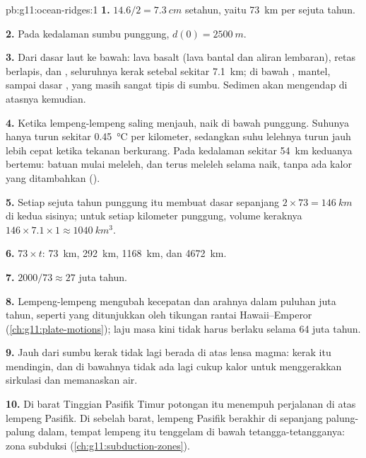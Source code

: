 \begin{solution}{pb:g11:ocean-ridges:1}
\textbf{1.} $14.6/2 = \qty{7.3}{cm}$ setahun, yaitu \qty{73}{km} per sejuta
tahun.

\textbf{2.} Pada kedalaman sumbu punggung, $d(0) = \qty{2500}{m}$.

\textbf{3.} Dari dasar laut ke bawah: lava basalt (lava bantal dan aliran
lembaran), retas berlapis, dan , seluruhnya kerak setebal sekitar
\qty{7.1}{km}; di bawah ,  mantel, sampai dasar , yang
masih sangat tipis di sumbu. Sedimen akan mengendap di atasnya kemudian.

\textbf{4.} Ketika lempeng-lempeng saling menjauh,  naik di bawah
punggung. Suhunya hanya turun sekitar \qty{0.45}{\celsius} per kilometer,
sedangkan suhu lelehnya turun jauh lebih cepat ketika tekanan berkurang. Pada
kedalaman sekitar \qty{54}{km} keduanya bertemu: batuan mulai meleleh, dan terus
meleleh selama naik, tanpa ada kalor yang ditambahkan ().

\textbf{5.} Setiap sejuta tahun punggung itu membuat dasar sepanjang
$2 \times 73 = \qty{146}{km}$ di kedua sisinya; untuk setiap kilometer punggung,
volume keraknya $146 \times 7.1 \times 1 \approx \qty{1040}{km^3}$.

\textbf{6.} $73 \times t$: \qty{73}{km}, \qty{292}{km}, \qty{1168}{km}, dan
\qty{4672}{km}.

\textbf{7.} $2000/73 \approx 27$ juta tahun.

\textbf{8.} Lempeng-lempeng mengubah kecepatan dan arahnya dalam puluhan juta
tahun, seperti yang ditunjukkan oleh tikungan rantai Hawaii--Emperor
(\cref{ch:g11:plate-motions}); laju masa kini tidak harus berlaku selama 64
juta tahun.

\textbf{9.} Jauh dari sumbu kerak tidak lagi berada di atas lensa magma: kerak
itu mendingin, dan di bawahnya tidak ada lagi cukup kalor untuk menggerakkan
sirkulasi dan memanaskan air.

\textbf{10.} Di barat Tinggian Pasifik Timur potongan itu menempuh perjalanan di
atas lempeng Pasifik. Di sebelah barat, lempeng Pasifik berakhir di sepanjang
palung-palung dalam, tempat lempeng itu tenggelam di bawah tetangga-tetangganya:
zona subduksi (\cref{ch:g11:subduction-zones}).


\end{solution}
